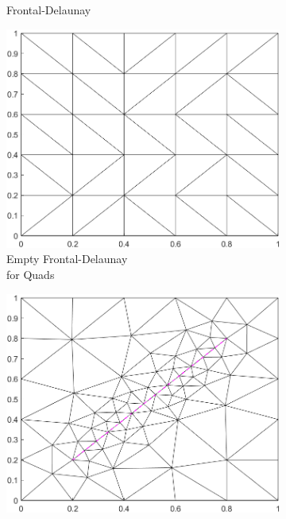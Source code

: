 \begin{figure}[ht]
\begin{subfigure}[b]{0.33\textwidth}
        \caption{Frontal-Delaunay}
        \label{fig:Gmsh-Frontal-Delaunay}
    \end{subfigure}
    \begin{subfigure}[b]{0.33\textwidth}
        \centering
        \includegraphics[width=\textwidth]{report/Images/Software/Gmsh meshing algorithms/gmsh_meshing_algorithms_delquad.png}
        \caption{Empty Frontal-Delaunay\\ for Quads}
        \label{fig:Gmsh-Frontal-Quads-empty}
    \end{subfigure}
    \begin{subfigure}[b]{0.33\textwidth}
        \centering
        \includegraphics[width=\textwidth]{report/Images/Software/Gmsh meshing algorithms/gmsh_meshing_algorithms_embedded_delquad.png}

\end{subfigure}
\end{figure}

